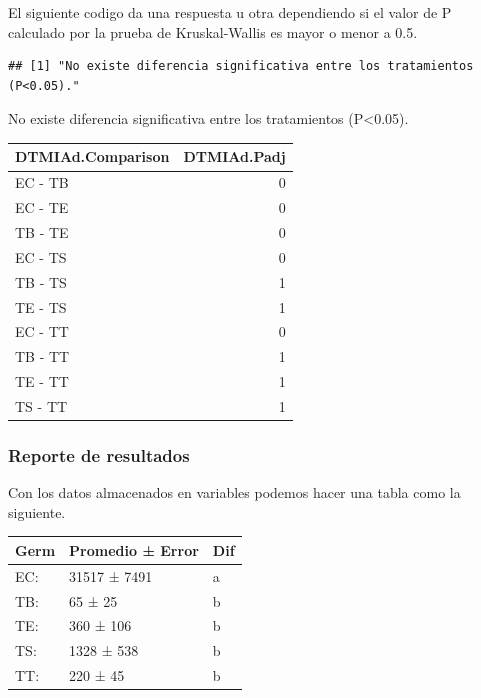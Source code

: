 \documentclass[]{article}
\newenvironment{Shaded}{\begin{snugshade}}{\end{snugshade}}
\newcommand{\ControlFlowTok}[1]{\textcolor[rgb]{0.13,0.29,0.53}{\textbf{#1}}}
\newcommand{\DecValTok}[1]{\textcolor[rgb]{0.00,0.00,0.81}{#1}}
\newcommand{\FloatTok}[1]{\textcolor[rgb]{0.00,0.00,0.81}{#1}}
\newcommand{\KeywordTok}[1]{\textcolor[rgb]{0.13,0.29,0.53}{\textbf{#1}}}
\newcommand{\NormalTok}[1]{#1}
\newcommand{\OperatorTok}[1]{\textcolor[rgb]{0.81,0.36,0.00}{\textbf{#1}}}
\newcommand{\StringTok}[1]{\textcolor[rgb]{0.31,0.60,0.02}{#1}}
\begin{document}
El siguiente codigo da una respuesta u otra dependiendo si el valor de P
calculado por la prueba de Kruskal-Wallis es mayor o menor a 0.5.

\begin{Shaded}
\end{Shaded}

\begin{verbatim}
## [1] "No existe diferencia significativa entre los tratamientos (P<0.05)."
\end{verbatim}

No existe diferencia significativa entre los tratamientos
(P\textless{}0.05).

\begin{longtable}[]{@{}lr@{}}
\toprule
DTMIAd.Comparison & DTMIAd.Padj\tabularnewline
\midrule
\endhead
EC - TB & 0\tabularnewline
EC - TE & 0\tabularnewline
TB - TE & 0\tabularnewline
EC - TS & 0\tabularnewline
TB - TS & 1\tabularnewline
TE - TS & 1\tabularnewline
EC - TT & 0\tabularnewline
TB - TT & 1\tabularnewline
TE - TT & 1\tabularnewline
TS - TT & 1\tabularnewline
\bottomrule
\end{longtable}

\hypertarget{reporte-de-resultados}{%
\subsubsection{Reporte de resultados}\label{reporte-de-resultados}}

Con los datos almacenados en variables podemos hacer una tabla como la
siguiente.

\begin{longtable}[]{@{}lll@{}}
\toprule
Germ & Promedio ± Error & Dif\tabularnewline
\midrule
\endhead
EC: & 31517 ± 7491 & a\tabularnewline
TB: & 65 ± 25 & b\tabularnewline
TE: & 360 ± 106 & b\tabularnewline
TS: & 1328 ± 538 & b\tabularnewline
TT: & 220 ± 45 & b\tabularnewline
\bottomrule
\end{longtable}
\end{document}
